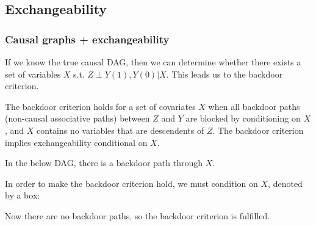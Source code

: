\subsection{Exchangeability}

\subsubsection{Causal graphs + exchangeability}

If we know the true causal DAG, then we can determine whether there exists a set of variables $X$ s.t. $Z \perp Y(1), Y(0) | X$. This leads us to the backdoor criterion.

\begin{definition}
The backdoor criterion holds for a set of covariates $X$ when all backdoor paths (non-causal associative paths) between $Z$ and $Y$ are blocked by conditioning on $X$, and $X$ contains no variables that are descendents of $Z$. The backdoor criterion implies exchangeability conditional on $X$. 
\end{definition}

\begin{example}
In the below DAG, there is a backdoor path through $X$.
\begin{center}
\end{center}

In order to make the backdoor criterion hold, we must condition on $X$, denoted by a box: 

\begin{center}
\end{center}

Now there are no backdoor paths, so the backdoor criterion is fulfilled. 
\end{example}

